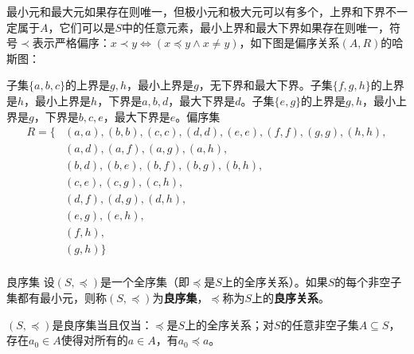 \documentclass[lang=cn,11pt]{elegantbook}
\begin{document}
最小元和最大元如果存在则唯一，但极小元和极大元可以有多个，上界和下界不一定属于$A$，它们可以是$S$中的任意元素，最小上界和最大下界如果存在则唯一，符号$\prec$表示严格偏序：$x \prec y \Leftrightarrow (x \preccurlyeq y \land x \neq y)$，如下图是偏序关系$(A,R)$的哈斯图：
\begin{figure}[!ht]
\centering
{}%
\end{figure}
子集$\{a,b,c\}$的上界是$g,h$，最小上界是$g$，无下界和最大下界。子集$\{f,g,h\}$的上界是$h$，最小上界是$h$，下界是$a,b,d$，最大下界是$d$。子集$\{e,g\}$的上界是$g,h$，最小上界是$g$，下界是$b,c,e$，最大下界是$e$。偏序集
\begin{align*}
R = \{&(a,a), (b,b), (c,c), (d,d), (e,e), (f,f), (g,g), (h,h),\\
&(a,d), (a,f), (a,g), (a,h),\\
&(b,d), (b,e), (b,f), (b,g), (b,h),\\
&(c,e), (c,g), (c,h),\\
&(d,f), (d,g), (d,h),\\
&(e,g), (e,h),\\
&(f,h),\\
&(g,h)\}\\
\end{align*}
\begin{definition}{良序集}
设$(S, \preccurlyeq)$是一个全序集（即$\preccurlyeq$是$S$上的全序关系）。如果$S$的每个非空子集都有最小元，则称$(S, \preccurlyeq)$为\textbf{良序集}，$\preccurlyeq$称为$S$上的\textbf{良序关系}。
\end{definition}
$(S, \preccurlyeq)$是良序集当且仅当：$\preccurlyeq$是$S$上的全序关系；对$S$的任意非空子集$A \subseteq S$，存在$a_0 \in A$使得对所有的$a \in A$，有$a_0 \preccurlyeq a$。
\end{document}
